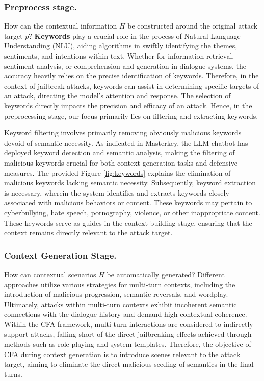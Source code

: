 \subsubsection{Preprocess stage.} How can the contextual information $H$ be constructed around the original attack target $p$? \textbf{Keywords} play a crucial role in the process of Natural Language Understanding (NLU), aiding algorithms in swiftly identifying the themes, sentiments, and intentions within text. Whether for information retrieval, sentiment analysis, or comprehension and generation in dialogue systems, the accuracy heavily relies on the precise identification of keywords. Therefore, in the context of jailbreak attacks, keywords can assist in determining specific targets of an attack, directing the model’s attention and response. The selection of keywords directly impacts the precision and efficacy of an attack. Hence, in the preprocessing stage, our focus primarily lies on filtering and extracting keywords.

Keyword filtering involves primarily removing obviously malicious keywords devoid of semantic necessity. As indicated in Masterkey\cite{deng2024masterkey}, the LLM chatbot has deployed keyword detection and semantic analysis, making the filtering of malicious keywords crucial for both context generation tasks and defensive measures. The provided Figure \ref{fig:keywords} explains the elimination of malicious keywords lacking semantic necessity. Subsequently, keyword extraction is necessary, wherein the system identifies and extracts keywords closely associated with malicious behaviors or content. These keywords may pertain to cyberbullying, hate speech, pornography, violence, or other inappropriate content. These keywords serve as guides in the context-building stage, ensuring that the context remains directly relevant to the attack target.


\subsubsection{Context Generation Stage.}How can contextual scenarios $H$ be automatically generated? Different approaches utilize various strategies for multi-turn contexts, including the introduction of malicious progression, semantic reversals, and wordplay. Ultimately, attacks within multi-turn contexts exhibit incoherent semantic connections with the dialogue history and demand high contextual coherence. Within the CFA framework, multi-turn interactions are considered to indirectly support attacks, falling short of the direct jailbreaking effects achieved through methods such as role-playing and system templates. Therefore, the objective of CFA during context generation is to introduce scenes relevant to the attack target, aiming to eliminate the direct malicious seeding of semantics in the final turns.

